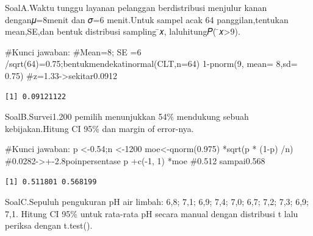 \documentclass[
  indonesian,
  letterpaper,
]{book}
\newenvironment{Shaded}{\begin{snugshade}}{\end{snugshade}}
\newcommand{\AttributeTok}[1]{\textcolor[rgb]{0.40,0.45,0.13}{#1}}
\newcommand{\CommentTok}[1]{\textcolor[rgb]{0.37,0.37,0.37}{#1}}
\newcommand{\DecValTok}[1]{\textcolor[rgb]{0.68,0.00,0.00}{#1}}
\newcommand{\FloatTok}[1]{\textcolor[rgb]{0.68,0.00,0.00}{#1}}
\newcommand{\FunctionTok}[1]{\textcolor[rgb]{0.28,0.35,0.67}{#1}}
\newcommand{\NormalTok}[1]{\textcolor[rgb]{0.00,0.23,0.31}{#1}}
\newcommand{\OtherTok}[1]{\textcolor[rgb]{0.00,0.23,0.31}{#1}}
\newcommand{\SpecialCharTok}[1]{\textcolor[rgb]{0.37,0.37,0.37}{#1}}
\begin{document}
SoalA.Waktu tunggu layanan pelanggan berdistribusi menjulur kanan
dengan𝜇=8menit dan 𝜎=6 menit.Untuk sampel acak 64 panggilan,tentukan
mean,SE,dan bentuk distribusi sampling ̄𝑥, laluhitung𝑃(
̄𝑥\textgreater9).

\begin{Shaded}
\begin{Highlighting}[]
\CommentTok{\#Kunci jawaban:}
\CommentTok{\#Mean=8; SE =6 /sqrt(64)=0.75;bentukmendekatinormal(CLT,n=64)}
\DecValTok{1}\SpecialCharTok{{-}}\FunctionTok{pnorm}\NormalTok{(}\DecValTok{9}\NormalTok{, }\AttributeTok{mean=} \DecValTok{8}\NormalTok{,}\AttributeTok{sd=} \FloatTok{0.75}\NormalTok{) }\CommentTok{\#z=1.33{-}\textgreater{}sekitar0.0912}
\end{Highlighting}
\end{Shaded}

\begin{verbatim}
[1] 0.09121122
\end{verbatim}

SoalB.Survei1.200 pemilih menunjukkan 54\% mendukung sebuah
kebijakan.Hitung CI 95\% dan margin of error-nya.

\begin{Shaded}
\begin{Highlighting}[]
\CommentTok{\#Kunci jawaban:}
\NormalTok{p }\OtherTok{\textless{}{-}}\FloatTok{0.54}\NormalTok{;n }\OtherTok{\textless{}{-}}\DecValTok{1200}
\NormalTok{moe}\OtherTok{\textless{}{-}}\FunctionTok{qnorm}\NormalTok{(}\FloatTok{0.975}\NormalTok{) }\SpecialCharTok{*}\FunctionTok{sqrt}\NormalTok{(p }\SpecialCharTok{*}\NormalTok{ (}\DecValTok{1}\SpecialCharTok{{-}}\NormalTok{p) }\SpecialCharTok{/}\NormalTok{n) }\CommentTok{\#0.0282{-}\textgreater{}+{-}2.8poinpersentase}
\NormalTok{p }\SpecialCharTok{+}\FunctionTok{c}\NormalTok{(}\SpecialCharTok{{-}}\DecValTok{1}\NormalTok{, }\DecValTok{1}\NormalTok{) }\SpecialCharTok{*}\NormalTok{moe }\CommentTok{\#0.512 sampai0.568}
\end{Highlighting}
\end{Shaded}

\begin{verbatim}
[1] 0.511801 0.568199
\end{verbatim}

SoalC.Sepuluh pengukuran pH air limbah: 6,8; 7,1; 6,9; 7,4; 7,0; 6,7;
7,2; 7,3; 6,9; 7,1. Hitung CI 95\% untuk rata-rata pH secara manual
dengan distribusi t lalu periksa dengan t.test().
\end{document}
